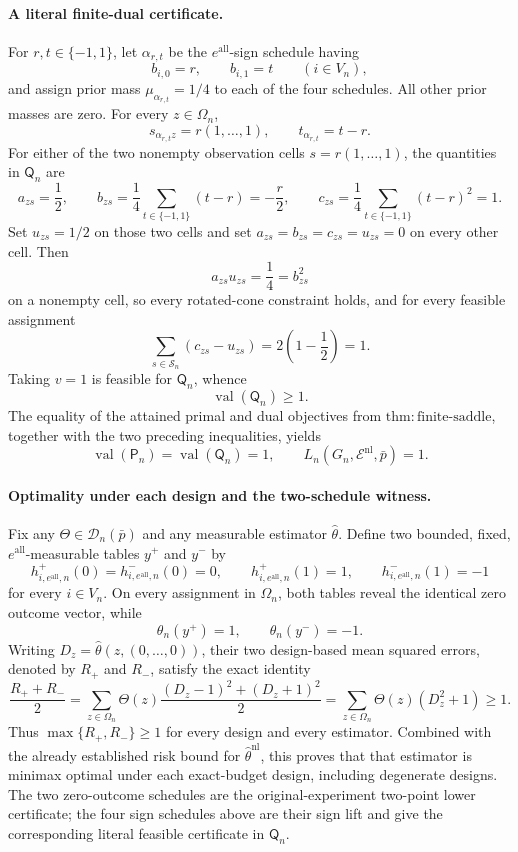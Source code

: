 \paragraph{A literal finite-dual certificate.}
For \(r,t\in\{-1,1\}\), let \(\alpha_{r,t}\) be the \(e^{\mathrm{all}}\)-sign schedule having
\[
b_{i,0}=r,
\qquad
b_{i,1}=t
\qquad(i\in V_n),
\]
and assign prior mass \(\mu_{\alpha_{r,t}}=1/4\) to each of the four schedules.  All other prior masses are zero.  For every \(z\in\Omega_n\),
\[
s_{\alpha_{r,t}z}=r(1,\ldots,1),
\qquad
t_{\alpha_{r,t}}=t-r.
\]
For either of the two nonempty observation cells \(s=r(1,\ldots,1)\), the quantities in \(\mathsf Q_n\) are
\[
a_{zs}=\frac12,
\qquad
b_{zs}=\frac14\sum_{t\in\{-1,1\}}(t-r)=-\frac r2,
\qquad
c_{zs}=\frac14\sum_{t\in\{-1,1\}}(t-r)^2=1.
\]
Set \(u_{zs}=1/2\) on those two cells and set \(a_{zs}=b_{zs}=c_{zs}=u_{zs}=0\) on every other cell.  Then
\[
a_{zs}u_{zs}=\frac14=b_{zs}^2
\]
on a nonempty cell, so every rotated-cone constraint holds, and for every feasible assignment
\[
\sum_{s\in\mathcal S_n}(c_{zs}-u_{zs})
=2\left(1-\frac12\right)=1.
\]
Taking \(v=1\) is feasible for \(\mathsf Q_n\), whence
\[
\operatorname{val}(\mathsf Q_n)\ge1.
\]
The equality of the attained primal and dual objectives from \(\mathrm{thm{:}finite\text{-}saddle}\), together with the two preceding inequalities, yields
\[
\operatorname{val}(\mathsf P_n)
=\operatorname{val}(\mathsf Q_n)=1,
\qquad
L_n(G_n,\mathcal E^{\mathrm{nl}},\bar p)=1.
\]

\paragraph{Optimality under each design and the two-schedule witness.}
Fix any \(\Theta\in\mathcal D_n(\bar p)\) and any measurable estimator \(\widehat\theta\).  Define two bounded, fixed, \(e^{\mathrm{all}}\)-measurable tables \(y^+\) and \(y^-\) by
\[
h^+_{i,e^{\mathrm{all}},n}(0)=h^-_{i,e^{\mathrm{all}},n}(0)=0,
\qquad
h^+_{i,e^{\mathrm{all}},n}(1)=1,
\qquad
h^-_{i,e^{\mathrm{all}},n}(1)=-1
\]
for every \(i\in V_n\).  On every assignment in \(\Omega_n\), both tables reveal the identical zero outcome vector, while
\[
\theta_n(y^+)=1,
\qquad
\theta_n(y^-)=-1.
\]
Writing \(D_z=\widehat\theta(z,(0,\ldots,0))\), their two design-based mean squared errors, denoted by \(R_+\) and \(R_-\), satisfy the exact identity
\[
\frac{R_++R_-}{2}
=\sum_{z\in\Omega_n}\Theta(z)
 \frac{(D_z-1)^2+(D_z+1)^2}{2}
=\sum_{z\in\Omega_n}\Theta(z)(D_z^2+1)
\ge1.
\]
Thus \(\max\{R_+,R_-\}\ge1\) for every design and every estimator.  Combined with the already established risk bound for \(\widehat\theta^{\mathrm{nl}}\), this proves that that estimator is minimax optimal under each exact-budget design, including degenerate designs.  The two zero-outcome schedules are the original-experiment two-point lower certificate; the four sign schedules above are their sign lift and give the corresponding literal feasible certificate in \(\mathsf Q_n\).

